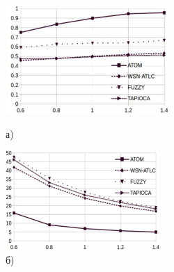 \begin{figure}[H]
    \centering
    \begin{minipage}[b]{0.45\textwidth}
        \centering
        \includegraphics[width=\textwidth]{assets/161}
        \caption*{а)}
    \end{minipage}
    \hspace{0.05\textwidth} %
    \begin{minipage}[b]{0.45\textwidth}
        \centering
        \includegraphics[width=\textwidth]{assets/162}
        \caption*{б)}
    \end{minipage}
    
    \vspace{0.05\textwidth} %
    

\end{figure}
